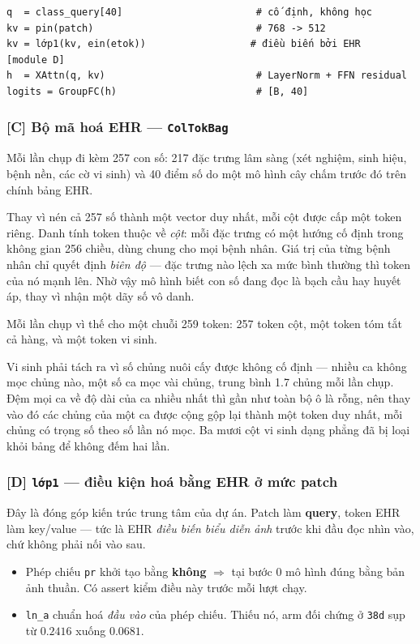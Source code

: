 \documentclass[11pt,a4paper]{article}
\newcommand{\code}[1]{\texttt{\small #1}}
\begin{document}
\begin{Verbatim}[fontsize=\small,frame=single,framesep=2mm]
q  = class_query[40]                       # cố định, không học
kv = pin(patch)                            # 768 -> 512
kv = lớp1(kv, ein(etok))                  # điều biến bởi EHR   [module D]
h  = XAttn(q, kv)                          # LayerNorm + FFN residual
logits = GroupFC(h)                        # [B, 40]
\end{Verbatim}

\subsubsection*{[C] Bộ mã hoá EHR --- \code{ColTokBag}}

Mỗi lần chụp đi kèm 257 con số: 217 đặc trưng lâm sàng (xét nghiệm, sinh hiệu, bệnh nền,
các cờ vi sinh) và 40 điểm số do một mô hình cây chấm trước đó trên chính bảng EHR.

Thay vì nén cả 257 số thành một vector duy nhất, mỗi cột được cấp một token riêng. Danh
tính token thuộc về \emph{cột}: mỗi đặc trưng có một hướng cố định trong không gian 256
chiều, dùng chung cho mọi bệnh nhân. Giá trị của từng bệnh nhân chỉ quyết định \emph{biên
độ} --- đặc trưng nào lệch xa mức bình thường thì token của nó mạnh lên. Nhờ vậy mô hình
biết con số đang đọc là bạch cầu hay huyết áp, thay vì nhận một dãy số vô danh.

Mỗi lần chụp vì thế cho một chuỗi 259 token: 257 token cột, một token tóm tắt cả hàng, và
một token vi sinh.

Vi sinh phải tách ra vì số chủng nuôi cấy được không cố định --- nhiều ca không mọc chủng
nào, một số ca mọc vài chủng, trung bình 1.7 chủng mỗi lần chụp. Đệm mọi ca về độ dài của
ca nhiều nhất thì gần như toàn bộ ô là rỗng, nên thay vào đó các chủng của một ca được
cộng gộp lại thành một token duy nhất, mỗi chủng có trọng số theo số lần nó mọc. Ba mươi
cột vi sinh dạng phẳng đã bị loại khỏi bảng để không đếm hai lần.


\subsubsection*{[D] \code{lớp1} --- điều kiện hoá bằng EHR ở mức patch}

Đây là đóng góp kiến trúc trung tâm của dự án. Patch làm \textbf{query}, token EHR làm
key/value --- tức là EHR \emph{điều biến biểu diễn ảnh} trước khi đầu đọc nhìn vào,
chứ không phải nối vào sau.

\begin{itemize}
\item Phép chiếu \code{pr} khởi tạo bằng \textbf{không} $\Rightarrow$ tại bước 0 mô hình
      đúng bằng bản ảnh thuần. Có assert kiểm điều này trước mỗi lượt chạy.
\item \code{ln\_a} chuẩn hoá \emph{đầu vào} của phép chiếu. Thiếu nó, arm đối chứng ở
      \code{38d} sụp từ $0.2416$ xuống $0.0681$.
\end{itemize}
\end{document}
